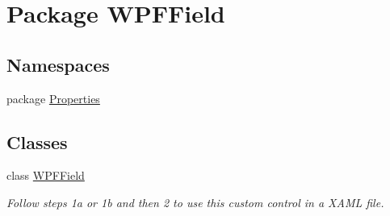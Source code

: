 \hypertarget{namespace_w_p_f_field}{\section{Package W\-P\-F\-Field}
\label{namespace_w_p_f_field}
}
\subsection*{Namespaces}
\begin{DoxyCompactItemize}
\item 
package \hyperlink{namespace_w_p_f_field_1_1_properties}{Properties}
\end{DoxyCompactItemize}
\subsection*{Classes}
\begin{DoxyCompactItemize}
\item 
class \hyperlink{class_w_p_f_field_1_1_w_p_f_field}{W\-P\-F\-Field}
\begin{DoxyCompactList}\small\item\em Follow steps 1a or 1b and then 2 to use this custom control in a X\-A\-M\-L file. \end{DoxyCompactList}\end{DoxyCompactItemize}
